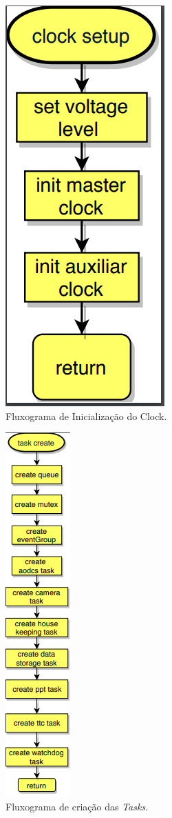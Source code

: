 \begin{apendicesenv}
\begin{figure}[!h]
	\centerfloat
	\centering
	\includegraphics[keepaspectratio=true,scale=0.4]{figuras/flowChart_clockSetup.PNG}
	\caption{Fluxograma de Inicialização do Clock.}
	\label{flowChart_clockSetup}
\end{figure}

\begin{figure}[!h]
	\centerfloat
	\centering
	\includegraphics[keepaspectratio=true,scale=0.85]{figuras/flowChart_taskCreate.PNG}
	\caption{Fluxograma de criação das \textit{Tasks}.}
	\label{flowChart_taskCreate}
\end{figure}


\end{apendicesenv}
